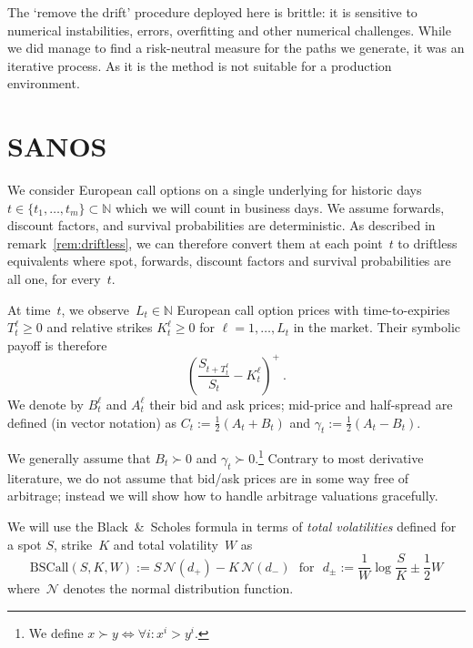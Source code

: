 \documentclass[11pt,a4paper]{article}
\newcommand{\N}{\mathbb{N}}
\newcommand{\BSCall}{\mathrm{BSCall}}
\begin{document}
The `remove the drift' procedure deployed here is brittle: it is sensitive to numerical instabilities,
errors, overfitting and other numerical challenges. While we did manage to find a risk-neutral
measure for the paths we generate, it was an iterative process. As it is the method is not suitable
for a production environment.


\section{SANOS}

\label{sec:markets}


We consider European call options on a single underlying
for historic days $t\in \{t_1,\ldots,t_m\}\subset \N$
which we will count in business days.
We assume forwards, discount factors, and survival probabilities
are deterministic. As described in remark~\ref{rem:driftless},
 we can therefore convert them at each point~$t$ to driftless equivalents
where spot, forwards, discount factors and survival probabilities are all one, for every~$t$.


At time~$t$, we observe~$L_t\in\N$ 
European call option prices with time-to-expiries $T_t^\ell \geq 0$ and
relative strikes $K_t^\ell\geq 0$
for $\ell=1,\ldots,L_t$
in the market. Their symbolic payoff is therefore
$$
   \left(\frac{S_{t+T_t^\ell}}{S_t} - K_t^\ell \right)^+ \ .
$$
We denote by $B_t^{\ell}$ and $A_t^\ell$ their bid and ask prices;
mid-price and half-spread are defined (in vector notation) as
$C_t := \tfrac{1}{2}(A_t + B_t)$ and
$\gamma_t := \tfrac{1}{2}(A_t - B_t)$.

We generally assume that $B_t\succ0$ and $\gamma_t\succ0$.\footnote{
We define $x \succ y \Leftrightarrow \forall i: x^i > y^i$.}
Contrary to most derivative literature, we do not assume that bid/ask prices are in some way free of arbitrage; instead
we will show how to handle arbitrage valuations gracefully.

We will use the Black~\&~Scholes formula in terms of \emph{total volatilities} defined 
for a spot $S$, strike~$K$ and total volatility~$W$ as
\begin{equation}\label{eq:bs}
    \BSCall(S,K,W) := S\,\mathcal{N}( d_+ ) - K\,\mathcal{N}(d_-)
    \ \ \ \mbox{for} \ \ \
    d_\pm := \frac{ 1 }{ W } \log \frac S K \pm \frac12 W
\end{equation}
where~$\mathcal{N}$ denotes the normal distribution function.
\end{document}
